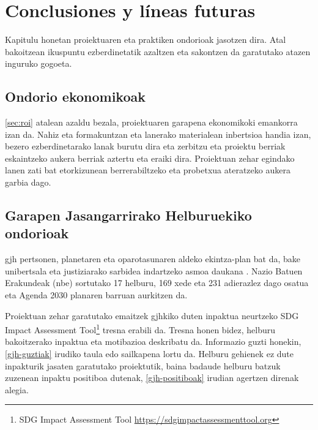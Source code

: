 \chapter{Conclusiones y líneas futuras}

\iffalse
     Kapitulu honetan proiektuaren eta praktiken ondorioak jasotzen dira. Atal bakoitzean
     ikuspuntu ezberdinetatik azaltzen eta sakontzen da garatutako atazen inguruko gogoeta.



\section{Ondorio ekonomikoak}
\ref{sec:roi} atalean azaldu bezala, proiektuaren garapena ekonomikoki emankorra izan da. Nahiz eta formakuntzan eta lanerako materialean inbertsioa handia izan, bezero ezberdinetarako lanak burutu dira eta zerbitzu eta proiektu berriak eskaintzeko aukera berriak aztertu eta eraiki dira. Proiektuan zehar egindako lanen zati bat etorkizunean berrerabiltzeko eta probetxua ateratzeko aukera garbia dago.
\section{Garapen Jasangarrirako Helburuekiko ondorioak}
\acrfull{gjh} pertsonen, planetaren eta oparotasunaren aldeko ekintza-plan bat da, bake unibertsala eta justiziarako sarbidea indartzeko asmoa daukana \cite{gjh}. Nazio Batuen Erakundeak (\acrshort{nbe}) sortutako 17 helburu, 169 xede eta 231 adierazlez dago osatua eta Agenda 2030 planaren barruan aurkitzen da.

Proiektuan zehar garatutako emaitzek \acrshort{gjh}kiko duten inpaktua neurtzeko SDG Impact Assessment Tool\footnote{SDG Impact Assessment Tool \url{https://sdgimpactassessmenttool.org}}  tresna erabili da. Tresna honen bidez, helburu bakoitzerako inpaktua eta motibazioa deskribatu da. Informazio guzti honekin, \ref{gjh-guztiak} irudiko taula edo sailkapena lortu da. Helburu gehienek ez dute inpakturik jasaten garatutako proiektutik, baina badaude helburu batzuk zuzenean inpaktu positiboa dutenak, \ref{gjh-positiboak} irudian agertzen direnak alegia.

